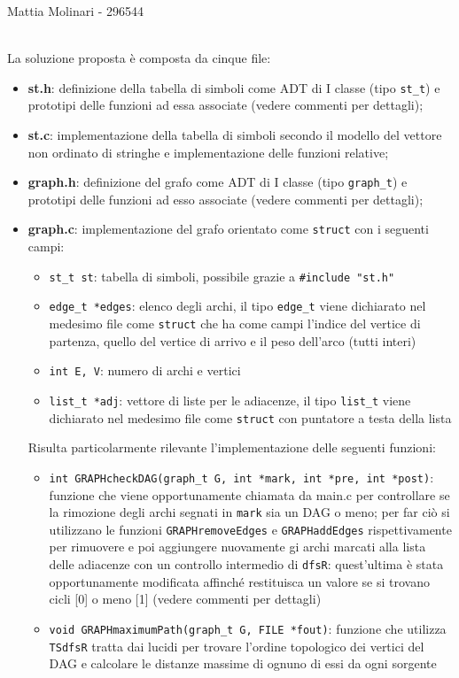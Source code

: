 \documentclass[11pt,a4paper]{report}
\begin{document}
\begin{center}
	\large	Mattia Molinari - 296544
	\end{center}
\\

La soluzione proposta è composta da cinque file:
\begin{itemize}
	\item \textbf{st.h}: definizione della tabella di simboli come ADT di I classe (tipo \lstinline|st_t|) e prototipi delle funzioni ad essa associate (vedere commenti per dettagli);

	\item \textbf{st.c}: implementazione della tabella di simboli secondo il modello del vettore non ordinato di stringhe e implementazione delle funzioni relative;
	\item \textbf{graph.h}: definizione del grafo come ADT di I classe (tipo \lstinline|graph_t|) e prototipi delle funzioni ad esso associate (vedere commenti per dettagli);
	\item \textbf{graph.c}: implementazione del grafo orientato come \lstinline|struct| con i seguenti campi:
	\begin{itemize}
		\item \lstinline|st_t st|: tabella di simboli, possibile grazie a \lstinline|#include "st.h"|
		\item \lstinline|edge_t *edges|: elenco degli archi, il tipo \lstinline|edge_t| viene dichiarato nel medesimo file come \lstinline|struct| che ha come campi l'indice del vertice di partenza, quello del vertice di arrivo e il peso dell'arco (tutti interi)
		\item \lstinline|int E, V|: numero di archi e vertici
		\item \lstinline|list_t *adj|: vettore di liste per le adiacenze, il tipo \lstinline|list_t| viene dichiarato nel medesimo file come \lstinline|struct| con puntatore a testa della lista
	\end{itemize}
	Risulta particolarmente rilevante l'implementazione delle seguenti funzioni:
	\begin{itemize}
		\item \lstinline|int GRAPHcheckDAG(graph_t G, int *mark, int *pre, int *post)|: funzione che viene opportunamente chiamata da main.c per controllare se la rimozione degli archi segnati in \lstinline|mark| sia un DAG o meno; per far ciò si utilizzano le funzioni \lstinline|GRAPHremoveEdges| e \lstinline|GRAPHaddEdges| rispettivamente per rimuovere e poi aggiungere nuovamente gi archi marcati alla lista delle adiacenze con un controllo intermedio di \lstinline|dfsR|: quest'ultima è stata opportunamente modificata affinché restituisca un valore se si trovano cicli [0] o meno [1] (vedere commenti per dettagli)
		\item \lstinline|void GRAPHmaximumPath(graph_t G, FILE *fout)|: funzione che utilizza \lstinline|TSdfsR| tratta dai lucidi per trovare l'ordine topologico dei vertici del DAG e calcolare le distanze massime di ognuno di essi da ogni sorgente
		

\end{itemize}
\end{itemize}
\end{document}
